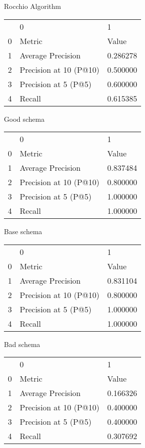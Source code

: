 

Rocchio Algorithm
\begin{tabular}{lll}
 & 0 & 1 \\
0 & Metric & Value \\
1 & Average Precision & 0.286278 \\
2 & Precision at 10 (P@10) & 0.500000 \\
3 & Precision at 5 (P@5) & 0.600000 \\
4 & Recall & 0.615385 \\
\end{tabular}


Good schema
\begin{tabular}{lll}
 & 0 & 1 \\
0 & Metric & Value \\
1 & Average Precision & 0.837484 \\
2 & Precision at 10 (P@10) & 0.800000 \\
3 & Precision at 5 (P@5) & 1.000000 \\
4 & Recall & 1.000000 \\
\end{tabular}


Base schema
\begin{tabular}{lll}
 & 0 & 1 \\
0 & Metric & Value \\
1 & Average Precision & 0.831104 \\
2 & Precision at 10 (P@10) & 0.800000 \\
3 & Precision at 5 (P@5) & 1.000000 \\
4 & Recall & 1.000000 \\
\end{tabular}


Bad schema
\begin{tabular}{lll}
 & 0 & 1 \\
0 & Metric & Value \\
1 & Average Precision & 0.166326 \\
2 & Precision at 10 (P@10) & 0.400000 \\
3 & Precision at 5 (P@5) & 0.400000 \\
4 & Recall & 0.307692 \\
\end{tabular}
